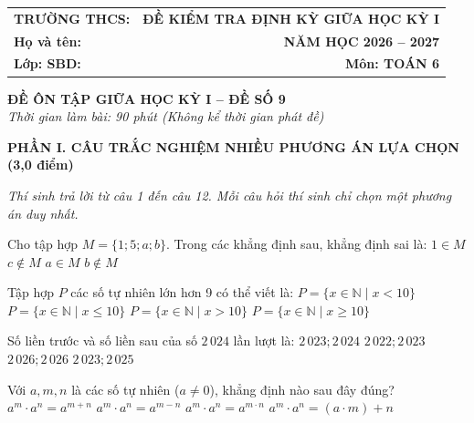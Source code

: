 \documentclass[12pt,a4paper]{article}
\begin{document}
\noindent
\begin{tabularx}{\linewidth}{X r}
\textbf{TRƯỜNG THCS: \dotfill} & \textbf{ĐỀ KIỂM TRA ĐỊNH KỲ GIỮA HỌC KỲ I} \\
\textbf{Họ và tên: \dotfill} & \textbf{NĂM HỌC 2026 -- 2027} \\
\textbf{Lớp: \dotfill \quad SBD: \dotfill} & \textbf{Môn: TOÁN 6} \\
\hline
\end{tabularx}
\vspace{2mm}

\begin{center}
  \textbf{\large ĐỀ ÔN TẬP GIỮA HỌC KỲ I -- ĐỀ SỐ 9}\\
  \textit{Thời gian làm bài: 90 phút (Không kể thời gian phát đề)}
\end{center}
\vspace{1mm}

\noindent\textbf{\large PHẦN I. CÂU TRẮC NGHIỆM NHIỀU PHƯƠNG ÁN LỰA CHỌN (3,0 điểm)}

\textit{Thí sinh trả lời từ câu 1 đến câu 12. Mỗi câu hỏi thí sinh chỉ chọn một phương án duy nhất.}

\vspace{1mm}
\begin{ex}
Cho tập hợp $M = \{1; 5; a; b\}$. Trong các khẳng định sau, khẳng định sai là:
\choice
{$1 \in M$}
{$c \notin M$}
{$a \in M$}
{\True $b \notin M$}
\end{ex}

\begin{ex}
Tập hợp $P$ các số tự nhiên lớn hơn 9 có thể viết là:
\choice
{$P = \{x \in \mathbb{N} \mid x < 10\}$}
{$P = \{x \in \mathbb{N} \mid x \le 10\}$}
{$P = \{x \in \mathbb{N} \mid x > 10\}$}
{\True $P = \{x \in \mathbb{N} \mid x \ge 10\}$}
\end{ex}

\begin{ex}
Số liền trước và số liền sau của số $2\,024$ lần lượt là:
\choice
{$2\,023; 2\,024$}
{$2\,022; 2\,023$}
{$2\,026; 2\,026$}
{\True $2\,023; 2\,025$}
\end{ex}

\begin{ex}
Với $a, m, n$ là các số tự nhiên ($a \ne 0$), khẳng định nào sau đây đúng?
\choice
{\True $a^m \cdot a^n = a^{m+n}$}
{$a^m \cdot a^n = a^{m-n}$}
{$a^m \cdot a^n = a^{m \cdot n}$}
{$a^m \cdot a^n = (a \cdot m) + n$}
\end{ex}
\end{document}
